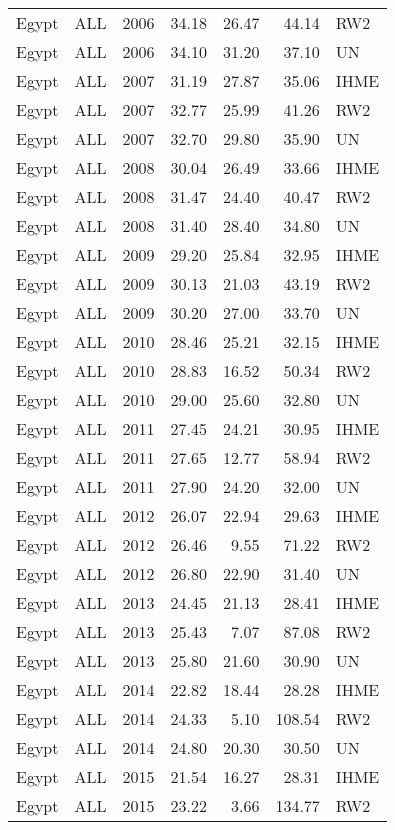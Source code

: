 \begin{longtable}{lllrrrl}
  Egypt & ALL & 2006 & 34.18 & 26.47 & 44.14 & RW2 \\ 
  Egypt & ALL & 2006 & 34.10 & 31.20 & 37.10 & UN \\ 
  Egypt & ALL & 2007 & 31.19 & 27.87 & 35.06 & IHME \\ 
  Egypt & ALL & 2007 & 32.77 & 25.99 & 41.26 & RW2 \\ 
  Egypt & ALL & 2007 & 32.70 & 29.80 & 35.90 & UN \\ 
  Egypt & ALL & 2008 & 30.04 & 26.49 & 33.66 & IHME \\ 
  Egypt & ALL & 2008 & 31.47 & 24.40 & 40.47 & RW2 \\ 
  Egypt & ALL & 2008 & 31.40 & 28.40 & 34.80 & UN \\ 
  Egypt & ALL & 2009 & 29.20 & 25.84 & 32.95 & IHME \\ 
  Egypt & ALL & 2009 & 30.13 & 21.03 & 43.19 & RW2 \\ 
  Egypt & ALL & 2009 & 30.20 & 27.00 & 33.70 & UN \\ 
  Egypt & ALL & 2010 & 28.46 & 25.21 & 32.15 & IHME \\ 
  Egypt & ALL & 2010 & 28.83 & 16.52 & 50.34 & RW2 \\ 
  Egypt & ALL & 2010 & 29.00 & 25.60 & 32.80 & UN \\ 
  Egypt & ALL & 2011 & 27.45 & 24.21 & 30.95 & IHME \\ 
  Egypt & ALL & 2011 & 27.65 & 12.77 & 58.94 & RW2 \\ 
  Egypt & ALL & 2011 & 27.90 & 24.20 & 32.00 & UN \\ 
  Egypt & ALL & 2012 & 26.07 & 22.94 & 29.63 & IHME \\ 
  Egypt & ALL & 2012 & 26.46 & 9.55 & 71.22 & RW2 \\ 
  Egypt & ALL & 2012 & 26.80 & 22.90 & 31.40 & UN \\ 
  Egypt & ALL & 2013 & 24.45 & 21.13 & 28.41 & IHME \\ 
  Egypt & ALL & 2013 & 25.43 & 7.07 & 87.08 & RW2 \\ 
  Egypt & ALL & 2013 & 25.80 & 21.60 & 30.90 & UN \\ 
  Egypt & ALL & 2014 & 22.82 & 18.44 & 28.28 & IHME \\ 
  Egypt & ALL & 2014 & 24.33 & 5.10 & 108.54 & RW2 \\ 
  Egypt & ALL & 2014 & 24.80 & 20.30 & 30.50 & UN \\ 
  Egypt & ALL & 2015 & 21.54 & 16.27 & 28.31 & IHME \\ 
  Egypt & ALL & 2015 & 23.22 & 3.66 & 134.77 & RW2 \\ 

\end{longtable}
